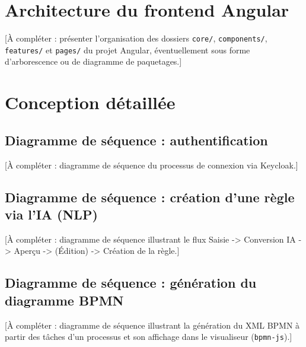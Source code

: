 \section{Architecture du frontend Angular}

[\`A compl\'eter : pr\'esenter l'organisation des dossiers \texttt{core/},
\texttt{components/}, \texttt{features/} et \texttt{pages/} du projet
Angular, \'eventuellement sous forme d'arborescence ou de diagramme de
paquetages.]

\section{Conception d\'etaill\'ee}

\subsection{Diagramme de s\'equence : authentification}
[\`A compl\'eter : diagramme de s\'equence du processus de connexion via
Keycloak.]

\subsection{Diagramme de s\'equence : cr\'eation d'une r\`egle via l'IA (NLP)}

[\`A compl\'eter : diagramme de s\'equence illustrant le flux Saisie ->
Conversion IA -> Aper\c{c}u -> (\'Edition) -> Cr\'eation de la r\`egle.]

\subsection{Diagramme de s\'equence : g\'en\'eration du diagramme BPMN}
[\`A compl\'eter : diagramme de s\'equence illustrant la g\'en\'eration du
XML BPMN \`a partir des t\^aches d'un processus et son affichage dans le
visualiseur (\texttt{bpmn-js}).]

